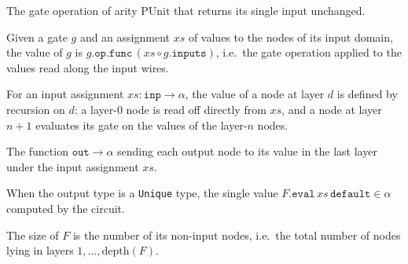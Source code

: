 \begin{definition}
\label{BoolCircuit.LayeredCircuit.GateOp.id}
\leanok
{}
The gate operation of arity $\mathrm{PUnit}$ that returns its single input
unchanged.
\end{definition}

\begin{definition}
\label{BoolCircuit.LayeredCircuit.Gate.eval}
\leanok
{}
Given a gate $g$ and an assignment $xs$ of values to the nodes of its input domain,
the value of $g$ is $g.\texttt{op}.\texttt{func}\,(xs \circ g.\texttt{inputs})$, i.e.\
the gate operation applied to the values read along the input wires.
\end{definition}

\begin{definition}
\label{BoolCircuit.LayeredCircuit.evalNode}
\leanok
{}
For an input assignment $xs : \texttt{inp} \to \alpha$, the value of a node at layer
$d$ is defined by recursion on $d$: a layer-$0$ node is read off directly from $xs$,
and a node at layer $n+1$ evaluates its gate on the values of the layer-$n$ nodes.
\end{definition}

\begin{definition}
\label{BoolCircuit.LayeredCircuit.eval}
\leanok
{}
The function $\texttt{out} \to \alpha$ sending each output node to its value in the
last layer under the input assignment $xs$.
\end{definition}

\begin{definition}
\label{BoolCircuit.LayeredCircuit.eval₁}
\leanok
{}
When the output type is a \texttt{Unique} type, the single value
$F.\texttt{eval}\,xs\,\texttt{default} \in \alpha$ computed by the circuit.
\end{definition}

\begin{definition}
\label{BoolCircuit.LayeredCircuit.size}
\leanok
The size of $F$ is the number of its non-input nodes, i.e.\ the total number of
nodes lying in layers $1, \dots, \mathrm{depth}(F)$.
\end{definition}

